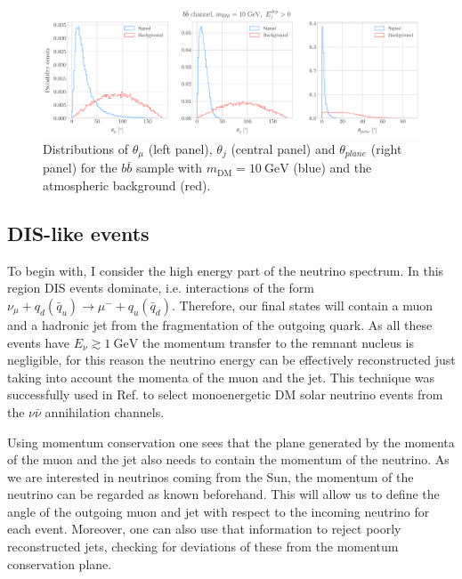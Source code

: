 \begin{figure}[t]
	\centering
	\includegraphics[width=0.95\linewidth]{Images/DM_Analysis/solardm_bb_100_dis_angular_dists.pdf}
	\caption[Angular distributions for the $b\bar{b}$ DIS sample with $m_{\mathrm{DM}} = 10 \ \mathrm{GeV}$ and the atmospheric background.]{Distributions of $\theta_{\mu}$ (left panel), $\theta_{j}$ (central panel) and $\theta_{plane}$ (right panel) for the $b\bar{b}$ sample with $m_{\mathrm{DM}} = 10 \ \mathrm{GeV}$ (blue) and the atmospheric background (red).}
	\label{fig:solardm_bb_100_dis_angular_dists}
\end{figure}

\subsection{DIS-like events}

To begin with, I consider the high energy part of the neutrino spectrum. In this region DIS events dominate, i.e. interactions of the form $\nu_{\mu} + q_{d}(\bar{q}_{u}) \rightarrow \mu^{-} + q_{u}(\bar{q}_{d})$. Therefore, our final states will contain a muon and a hadronic jet from the fragmentation of the outgoing quark. As all these events have $E_{\nu} \gtrsim 1 \ \mathrm{GeV}$ the momentum transfer to the remnant nucleus is negligible, for this reason the neutrino energy can be effectively reconstructed just taking into account the momenta of the muon and the jet. This technique was successfully used in Ref. \cite{Rott2019} to select monoenergetic DM solar neutrino events from the $\nu \bar{\nu}$ annihilation channels.

Using momentum conservation one sees that the plane generated by the momenta of the muon and the jet also needs to contain the momentum of the neutrino. As we are interested in neutrinos coming from the Sun, the momentum of the neutrino can be regarded as known beforehand. This will allow us to define the angle of the outgoing muon and jet with respect to the incoming neutrino for each event. Moreover, one can also use that information to reject poorly reconstructed jets, checking for deviations of these from the momentum conservation plane.


